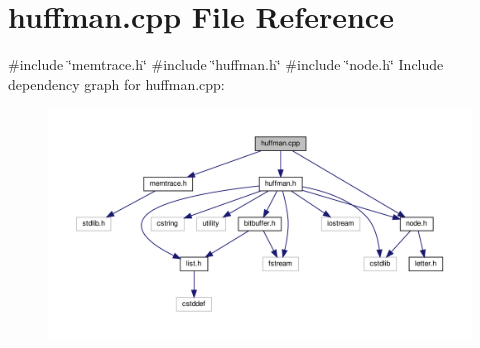 \section{huffman.\+cpp File Reference}
\label{huffman_8cpp}
{\ttfamily \#include \char`\"{}memtrace.\+h\char`\"{}}\newline
{\ttfamily \#include \char`\"{}huffman.\+h\char`\"{}}\newline
{\ttfamily \#include \char`\"{}node.\+h\char`\"{}}\newline
Include dependency graph for huffman.\+cpp\+:
\nopagebreak
\begin{figure}[H]
\begin{center}
\leavevmode
\includegraphics[width=350pt]{huffman_8cpp__incl}
\end{center}
\end{figure}
